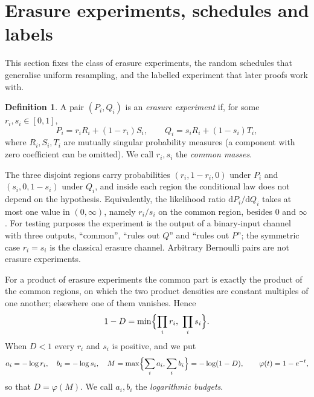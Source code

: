 \documentclass[11pt,a4paper]{article}
\theoremstyle{definition}\newtheorem{definition}[theorem]{Definition}
\theoremstyle{remark}\newtheorem{remark}[theorem]{Remark}
\newcommand{\dd}{\mathrm d}
\newcommand{\ph}{\varphi}
\begin{document}
\section{Erasure experiments, schedules and labels}\label{sec:setup}
This section fixes the class of erasure experiments, the random schedules that generalise uniform resampling, and the labelled experiment that later proofs work with.

\begin{definition}\label{def:class}
A pair $(P_i,Q_i)$ is an \emph{erasure experiment} if, for some $r_i,s_i\in[0,1]$,
\begin{equation}\label{eq:erasure}
 P_i=r_iR_i+(1-r_i)S_i,\qquad
 Q_i=s_iR_i+(1-s_i)T_i,
\end{equation}
where $R_i,S_i,T_i$ are mutually singular probability measures (a component with zero coefficient can be omitted). We call $r_i,s_i$ the \emph{common masses}.
\end{definition}
The three disjoint regions carry probabilities $(r_i,1-r_i,0)$ under $P_i$ and $(s_i,0,1-s_i)$ under $Q_i$, and inside each region the conditional law does not depend on the hypothesis. Equivalently, the likelihood ratio $\dd P_i/\dd Q_i$ takes at most one value in $(0,\infty)$, namely $r_i/s_i$ on the common region, besides $0$ and $\infty$. For testing purposes the experiment is the output of a binary-input channel with three outputs, ``common'', ``rules out $Q$'' and ``rules out $P$''; the symmetric case $r_i=s_i$ is the classical erasure channel. Arbitrary Bernoulli pairs are not erasure experiments.

For a product of erasure experiments the common part is exactly the product of the common regions, on which the two product densities are constant multiples of one another; elsewhere one of them vanishes. Hence
\begin{equation}\label{eq:overlap}
1-D=\min\Bigl\{\prod_i r_i,\ \prod_i s_i\Bigr\}.
\end{equation}
When $D<1$ every $r_i$ and $s_i$ is positive, and we put
\begin{equation}\label{eq:logs}
a_i=-\log r_i,\quad b_i=-\log s_i,\quad
M=\max\Bigl\{\sum_i a_i,\sum_i b_i\Bigr\}=-\log(1-D),\qquad
\ph(t)=1-e^{-t},
\end{equation}
so that $D=\ph(M)$. We call $a_i,b_i$ the \emph{logarithmic budgets}.
\end{document}
